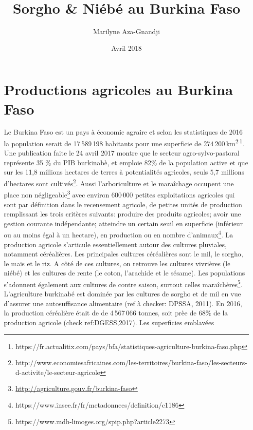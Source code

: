 \documentclass[a4paper,11pt]{article}
\begin{document}
\title{Sorgho \& Niébé au Burkina Faso}
\author{Marilyne Aza-Gnandji}
\date{Avril 2018} 

\maketitle
\tableofcontents

\section{Productions agricoles au Burkina Faso}

Le Burkina Faso est un pays à économie agraire\cite{Koulibi_FideleZONGO}
et selon les statistiques de 2016 la population serait de 17\,589\,198 habitants
pour une superficie de 274\,200\,km\textsuperscript{2}\,\footnote{https://fr.actualitix.com/pays/bfa/statistiques-agriculture-burkina-faso.php}. Une publication faite le 24 avril 2017 montre que le  secteur agro-sylvo-pastoral représente 35 \% du PIB burkinabè, et emploie 82\% de la population active et que sur les 11,8 millions hectares de terres à potentialités agricoles, seuls 5,7 millions d’hectares sont cultivés\footnote{http://www.economiesafricaines.com/les-territoires/burkina-faso/les-secteurs-d-activite/le-secteur-agricole}. Aussi l'arboriculture et le maraîchage occupent une place
non négligeable\footnote{\url{http://agriculture.gouv.fr/burkina-faso}}
avec environ 600\,000 petites exploitations agricoles qui sont par
définition dans le recensement agricole, de petites unités de
production remplissant les trois critères suivants: produire des
produits agricoles; avoir une gestion courante indépendante; atteindre
un certain seuil en superficie (inférieur ou au moins égal à un
hectare), en production ou en nombre d’animaux\footnote{https://www.insee.fr/fr/metadonnees/definition/c1186}. La production agricole s’articule essentiellement autour des cultures pluviales, notamment céréalières. Les principales cultures céréalières sont le mil, le sorgho, le maïs et le riz. A côté de ces cultures, on retrouve les cultures vivrières (le niébé) et les cultures de rente (le coton, l’arachide et le sésame). Les populations s’adonnent également aux cultures de contre saison, surtout celles maraîchères\footnote{https://www.mdh-limoges.org/spip.php?article2273}.
L'agriculture burkinabé est dominée par les cultures de sorgho et de
mil en vue d'assurer une autosuffisance alimentaire (ref à checker: DPSSA, 2011).
En 2016, la production céréalière était de de 4\,567\,066 tonnes, soit prèe
de 68\% de la production agricole (check ref:DGESS,2017). Les superficies emblavées
\end{document}
